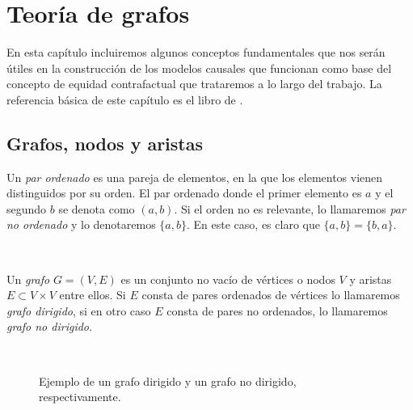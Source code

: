 \documentclass[oneside,openright,titlepage,numbers=noenddot,openany,headinclude,footinclude=true,
cleardoublepage=empty,abstractoff,BCOR=5mm,paper=a4,fontsize=12pt,main=spanish]{scrreprt}
\begin{document}
\chapter{Teoría de grafos} \label{ch:teorgraf}

En esta capítulo incluiremos algunos conceptos fundamentales que nos serán útiles en la construcción de los modelos causales que funcionan como base del concepto de equidad contrafactual que trataremos a lo largo del trabajo. La referencia básica de este capítulo es el libro de \cite{graphtheory2001}.

\section{Grafos, nodos y aristas}

\begin{definition}
Un \textit{par ordenado} es una pareja de elementos, en la que los elementos vienen distinguidos por su orden. El par ordenado donde el primer elemento es $a$ y el segundo $b$ se denota como $(a,b)$. Si el orden no es relevante, lo llamaremos \textit{par no ordenado} y lo denotaremos $\{a,b\}$. En este caso, es claro que $\{a,b\}=\{b,a\}$.
\end{definition}\

\begin{definition}[Grafo]
Un \textit{grafo} $G = (V,E)$ es un conjunto no vacío de vértices o nodos $V$ y aristas $E \subset V\times V$ entre ellos.
Si $E$ consta de pares ordenados de vértices lo llamaremos \textit{grafo dirigido}, si en otro caso $E$ consta de pares no ordenados, lo llamaremos \textit{grafo no dirigido}.
\end{definition}\

\begin{figure}[h]
\centering
{}
\caption{Ejemplo de un grafo dirigido y un grafo no dirigido, respectivamente.}
\label{fig:dirungraphs}
\end{figure}\
\end{document}
